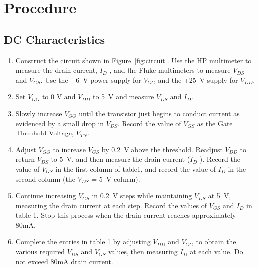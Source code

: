 
\section{Procedure}
\label{sec:procedure}

\subsection{DC Characteristics}
\label{sec:inverter}

\begin{enumerate}
\item Construct the circuit shown in Figure~\ref{fig:circuit}. Use the HP multimeter to measure the drain current, $I_D$ , and the Fluke multimeters to measure $V_{DS}$ and $V_{GS}$. Use the +\SI{6}{V} power supply for $V_{GG}$ and the +\SI{25}{V} supply for $V_{DD}$.
\item Set $V_{GG}$ to 0 V and $V_{DD}$ to \SI{5}{V} and measure $V_{DS}$ and $I_D$.
\item Slowly increase $V_{GG}$ until the transistor just begins to conduct current as evidenced by a small drop in $V_{DS}$. Record the value of $V_{GS}$ as the Gate Threshold Voltage, $V_{TN}$.
\item Adjust $V_{GG}$ to increase $V_{GS}$ by \SI{0.2}{V} above the threshold. Readjust $V_{DD}$ to return $V_{DS}$ to \SI{5}{V}, and then measure the drain current ($I_D$ ). Record the value of $V_{GS}$ in the first column of table1, and record the value of $I_D$ in the second column (the $V_{DS}$ = \SI{5}{V} column).
\item Continue increasing $V_{GS}$ in \SI{0.2}{V} steps while maintaining $V_{DS}$ at \SI{5}{V}, measuring the drain current at each step. Record the values of $V_{GS}$ and $I_D$ in table 1. Stop this process when the drain current reaches approximately 80mA.
\item Complete the entries in table 1 by adjusting $V_{DD}$ and $V_{GG}$ to obtain the various required $V_{DS}$ and $V_{GS}$ values, then measuring $I_D$ at each value. Do not exceed 80mA drain current.
\end{enumerate}

